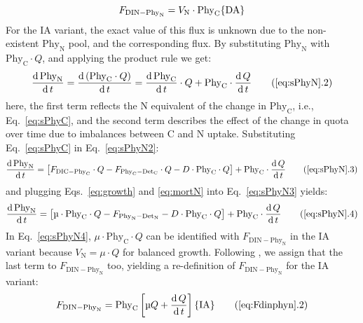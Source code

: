 \documentclass[gmd, manuscript]{copernicus}
\begin{document}
\begin{equation}
  \label{eq:Fdinphyn}
  F_{\text{DIN}-\text{Phy}_{\text{N}}} = V_{\text{N}} \cdot \text{Phy}_{\text{C}} \hfill \{\text{DA}\}
\end{equation}
For the IA variant, the exact value of this flux is unknown due to the non-existent $\text{Phy}_{\text{N}}$ pool, and the corresponding flux. By substituting $\text{Phy}_{\text{N}}$ with  $\text{Phy}_{\text{C}}\cdot Q$, and applying the product rule we get:
\begin{equation}
  \label{eq:sPhyN2}
  \frac{\mathrm{d}\,\text{Phy}_{\text{N}}}{\mathrm{d}\,t} = \frac{\mathrm{d}\,(\text{Phy}_{\text{C}}\cdot Q)}{\mathrm{d}\,t}
  = \frac{\mathrm{d}\,\text{Phy}_{\text{C}}}{\mathrm{d}\,t} \cdot Q + \text{Phy}_{\text{C}} \cdot \frac{\mathrm{d}\,Q}{\mathrm{d}\,t} \tag{\ref{eq:sPhyN}.2}
\end{equation}
here, the first term reflects the N equivalent of the change in $\text{Phy}_{\text{C}}$, i.e., Eq.~\eqref{eq:sPhyC}, and the second term describes the effect of the change in quota over time due to imbalances between C and N uptake. Substituting Eq.~\eqref{eq:sPhyC} in Eq.~\eqref{eq:sPhyN2}:
\begin{equation}
  \label{eq:sPhyN3}
  \frac{\mathrm{d}\,\text{Phy}_{\text{N}}}{\mathrm{d}\,t} = \left[ F_{\text{DIC}-\text{Phy}_{\text{C}}} \cdot Q - F_{\text{Phy}_{\text{C}}-\text{Det}_{\text{C}}} \cdot Q - D \cdot \text{Phy}_{\text{C}} \cdot Q \right] + \text{Phy}_{\text{C}} \cdot \frac{\mathrm{d}\,Q}{\mathrm{d}\,t}
 \tag{\ref{eq:sPhyN}.3}
\end{equation}
and plugging Eqs.~\eqref{eq:growth} and \eqref{eq:mortN} into Eq.~\eqref{eq:sPhyN3} yields:
\begin{equation}
  \label{eq:sPhyN4}
  \frac{\mathrm{d}\,\text{Phy}_{\text{N}}}{\mathrm{d}\,t} = \left[ \mu \cdot \text{Phy}_{\text{C}} \cdot Q - F_{\text{Phy}_{\text{N}}-\text{Det}_{\text{N}}} - D \cdot \text{Phy}_{\text{C}} \cdot Q \right] + \text{Phy}_{\text{C}} \cdot \frac{\mathrm{d}\,Q}{\mathrm{d}\,t}
 \tag{\ref{eq:sPhyN}.4}
\end{equation}
In Eq.~\eqref{eq:sPhyN4}, $\mu \cdot \text{Phy}_{\text{C}} \cdot Q$ can be identified with $F_{\text{DIN}-\text{Phy}_{\text{N}}}$ in the IA variant because $V_{\text{N}} = \mu\cdot Q$ for balanced growth. Following \citet{Smith2016}, we assign that the last term to $F_{\text{DIN}-\text{Phy}_{\text{N}}}$ too, yielding a re-definition of $F_{\text{DIN}-\text{Phy}_{\text{N}}}$ for the IA variant:
\begin{equation}
  \label{eq:Fdinphyn2}
  F_{\text{DIN}-\text{Phy}_{\text{N}}} = \text{Phy}_{\text{C}} \left[ \mu Q + \frac{\mathrm{d}\,Q}{\mathrm{d}\,t} \right] \hfill \{\text{IA}\}
  \tag{\ref{eq:Fdinphyn}.2}
\end{equation}
\end{document}
